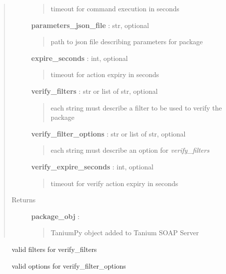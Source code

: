 \documentclass[letterpaper,10pt,english]{sphinxmanual}
\begin{document}
\begin{fulllineitems}
\begin{quote}
\begin{description}
\begin{quote}
timeout for command execution in seconds
\end{quote}

\textbf{parameters\_json\_file} : str, optional
\begin{quote}

path to json file describing parameters for package
\end{quote}

\textbf{expire\_seconds} : int, optional
\begin{quote}

timeout for action expiry in seconds
\end{quote}

\textbf{verify\_filters} : str or list of str, optional
\begin{quote}

each string must describe a filter to be used to verify the package
\end{quote}

\textbf{verify\_filter\_options} : str or list of str, optional
\begin{quote}

each string must describe an option for \emph{verify\_filters}
\end{quote}

\textbf{verify\_expire\_seconds} : int, optional
\begin{quote}

timeout for verify action expiry in seconds
\end{quote}

\item[{Returns}] \leavevmode
\textbf{package\_obj} : {\hyperref[taniumpy.object_types:taniumpy.object_types.package_spec.PackageSpec]{}}
\begin{quote}

TaniumPy object added to Tanium SOAP Server
\end{quote}

\end{description}\end{quote}



\begin{description}
\item[{{\hyperref[pytan.constants:pytan.constants.FILTER_MAPS]{}}}] \leavevmode
valid filters for verify\_filters

\item[{{\hyperref[pytan.constants:pytan.constants.OPTION_MAPS]{}}}] \leavevmode
valid options for verify\_filter\_options

\end{description}



\end{fulllineitems}
\end{document}
